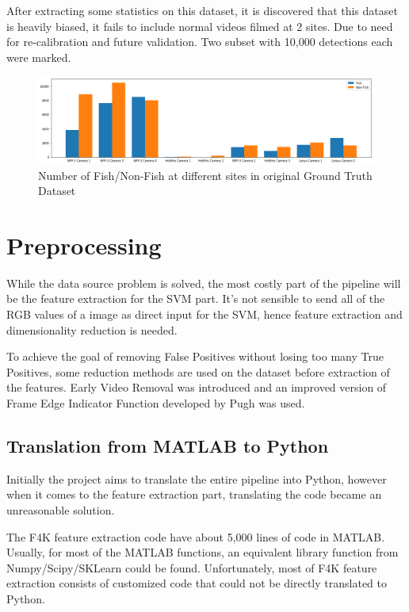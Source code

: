 \documentclass[bsc,logo,twoside,fullspacing,parskip]{infthesis}
\begin{document}
After extracting some statistics on this dataset, it is discovered that this dataset is heavily biased, it fails to include normal videos filmed at 2 sites. Due to need for re-calibration and future validation. Two subset with 10,000 detections each were marked.

\begin{figure}[h]
    \centering
    \includegraphics[scale=0.34]{graph/classdist.png}
    \caption{Number of Fish/Non-Fish at different sites in original Ground Truth Dataset}
    \label{fig:gtdist}
\end{figure}


\chapter{Preprocessing}
\label{sec:prepro}

While the data source problem is solved, the most costly part of the pipeline will be the feature extraction for the SVM part. 
It's not sensible to send all of the RGB values of a image as direct input for the SVM, hence feature extraction and dimensionality reduction is needed.

To achieve the goal of removing False Positives without losing too many True Positives, some reduction methods are used on the dataset before extraction of the features. 
Early Video Removal was introduced and an improved version of Frame Edge Indicator Function developed by Pugh was used.

\section{Translation from MATLAB to Python}
\label{sec:translate}

Initially the project aims to translate the entire pipeline into Python, however when it comes to the feature extraction part, translating the code became an unreasonable solution.

The F4K feature extraction code have about 5,000 lines of code in MATLAB.
Usually, for most of the MATLAB functions, an equivalent library function from Numpy/Scipy/SKLearn could be found.
Unfortunately, most of F4K feature extraction consists of customized code that could not be directly translated to Python.
\end{document}
